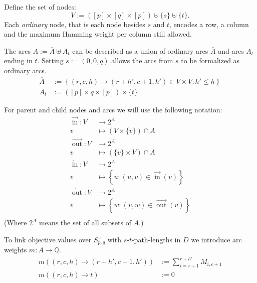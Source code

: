 \documentclass[a4paper]{amsart}
\theoremstyle{lemma}
\theoremstyle{definition}
\theoremstyle{remark}
\DeclareMathOperator{\In}{in}
\DeclareMathOperator{\Out}{out}
\newcommand{\ina}{\ensuremath{\vec{\In}}}
\newcommand{\outa}{\ensuremath{\vec{\Out}}}
\newcommand{\inv}{\ensuremath{\dot{\In}}}
\newcommand{\outv}{\ensuremath{\dot{\Out}}}
\begin{document}
Define the set of nodes:
\[V := \left( [p]\times [q] \times [p]\right) \uplus \{s\} \uplus \{t\}\text{.}\] 
Each \textit{ordinary} node, that is
each node besides \(s\) and \(t\), encodes a row, a column and the
maximum Hamming weight per column still allowed.

The arcs \(A := \overline{A} \uplus A_t\) can be described as a union
of ordinary arcs \(\overline{A}\) and arcs \(A_t\) ending in \(t\).  Setting
\(s:=(0, 0, q)\) allows the arcs from $s$ to be formalized as
ordinary arcs.
\begin{align}
  \overline{A} &:=
  \left\{ \left(r, c, h\right) \rightarrow \left(r+h', c+1, h'\right) \in V \times V \colon
  h' \leq h \right\} \\
  A_t &:= ([p] \times {q} \times [p]) \times \{t\}
\end{align}

For parent and child nodes and arcs we will use the following notation:
\begin{align*}
\ina\colon  V &\to 2^A \\
v &\mapsto \left(V \times \{v\}\right) \cap A\\
\outa\colon  V &\to 2^A \\
v &\mapsto \left(\{v\} \times V\right) \cap A\\
\inv\colon  V &\to 2^A \\
v &\mapsto \left\{ u \colon \left(u, v\right) \in \ina(v) \right\}\\
\outv\colon  V &\to 2^A \\
v &\mapsto \left\{w \colon \left(v, w\right) \in \outa\left(v\right) \right\}\\
\end{align*}
(Where \(2^A\) means the set of all subsets of \(A\).)

To link objective values over \(S^=_{p, q}\) with
\(s\)-\(t\)-path-lengths in \(D\) we introduce arc weights \(m\colon A \to \mathbb{Q}\).
\begin{align}
\label{objLink}
  m\left(\left(r, c, h\right) \rightarrow \left(r+h', c+1, h'\right) \right) & := \sum_{i=r+1}^{r+h'} M_{i, c+1} \\
  m\left(\left(r, c, h\right) \rightarrow t \right) & := 0
\end{align}
\end{document}
